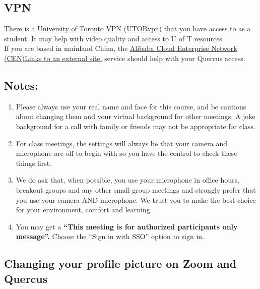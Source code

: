 \documentclass[
]{book}
\begin{document}
\hypertarget{vpn}{%
\subsection{VPN}\label{vpn}}

There is a \href{https://isea.utoronto.ca/services/vpn/utorvpn/}{University of Toronto VPN (UTORvpn)} that you have access to as a student. It may help with video quality and access to U of T resources.\\
If you are based in mainland China, the \href{https://onesearch.library.utoronto.ca/ic-faq-categories/alibaba-cloud-enterprise-network-cen-service}{Alibaba Cloud Enterprise Network (CEN)Links to an external site.} service should help with your Quercus access.

\hypertarget{notes}{%
\subsection{Notes:}\label{notes}}

\begin{enumerate}
\def\labelenumi{\arabic{enumi}.}
\item
  Please always use your real name and face for this course, and be cautious about changing them and your virtual background for other meetings. A joke background for a call with family or friends may not be appropriate for class.
\item
  For class meetings, the settings will always be that your camera and microphone are off to begin with so you have the control to check these things first.
\item
  We do ask that, when possible, you use your microphone in office hours, breakout groups and any other small group meetings and strongly prefer that you use your camera AND microphone. We trust you to make the best choice for your environment, comfort and learning.
\item
  You may get a \textbf{``This meeting is for authorized participants only message''.} Choose the ``Sign in with SSO'' option to sign in.
\end{enumerate}

\hypertarget{changing-your-profile-picture-on-zoom-and-quercus}{%
\subsection{Changing your profile picture on Zoom and Quercus}\label{changing-your-profile-picture-on-zoom-and-quercus}}
\end{document}
